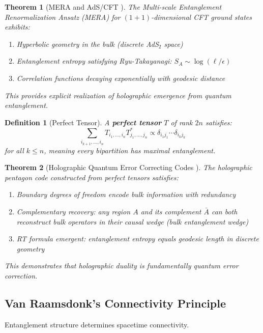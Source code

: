 \documentclass[11pt,a4paper]{article}
\newtheorem{theorem}{Theorem}[section]
\newtheorem{definition}{Definition}[section]
\theoremstyle{remark}
\theoremstyle{definition}
\begin{document}
\begin{theorem}[MERA and AdS/CFT \cite{Swingle2012}]
The Multi-scale Entanglement Renormalization Ansatz (MERA) for $(1+1)$-dimensional CFT ground states exhibits:
\begin{enumerate}[label=(\roman*)]
\item Hyperbolic geometry in the bulk (discrete AdS$_2$ space)
\item Entanglement entropy satisfying Ryu-Takayanagi: $S_A \sim \log(\ell/\epsilon)$
\item Correlation functions decaying exponentially with geodesic distance
\end{enumerate}
This provides explicit realization of holographic emergence from quantum entanglement.
\end{theorem}

\begin{definition}[Perfect Tensor]
A \textbf{perfect tensor} $T$ of rank $2n$ satisfies:
\begin{equation}
\sum_{i_{k+1}, \ldots, i_n} T_{i_1, \ldots, i_n} T^*_{j_1, \ldots, j_n} \propto \delta_{i_1 j_1} \cdots \delta_{i_k j_k}
\end{equation}
for all $k \leq n$, meaning every bipartition has maximal entanglement.
\end{definition}

\begin{theorem}[Holographic Quantum Error Correcting Codes \cite{Pastawski2015}]
The holographic pentagon code constructed from perfect tensors satisfies:
\begin{enumerate}[label=(\roman*)]
\item Boundary degrees of freedom encode bulk information with redundancy
\item Complementary recovery: any region $A$ and its complement $\bar{A}$ can both reconstruct bulk operators in their causal wedge (bulk entanglement wedge)
\item RT formula emergent: entanglement entropy equals geodesic length in discrete geometry
\end{enumerate}
This demonstrates that holographic duality is fundamentally quantum error correction.
\end{theorem}

\subsection{Van Raamsdonk's Connectivity Principle}

Entanglement structure determines spacetime connectivity.
\end{document}
